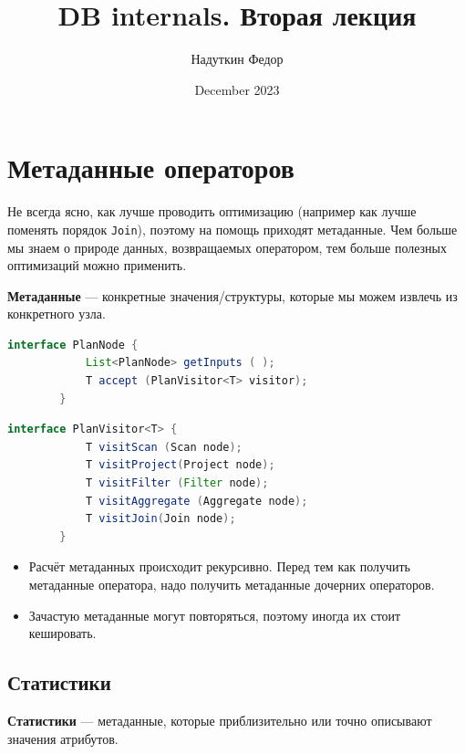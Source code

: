 \documentclass[11pt]{article}
\title{DB internals. Вторая лекция}
\author{Надуткин Федор }
\date{December 2023}
\begin{document}
    \maketitle

    \newpage

    \section*{Метаданные операторов}

    Не всегда ясно, как лучше проводить оптимизацию (например как лучше поменять порядок \texttt{Join}), поэтому на помощь приходят метаданные.
    Чем больше мы знаем о природе данных, возвращаемых оператором, тем больше полезных оптимизаций можно применить.

    \textbf{Метаданные} --- конкретные значения/структуры, которые мы можем извлечь из конкретного узла.

    \begin{lstlisting}[language=Java,label={lst:plan_node}]
        interface PlanNode {
            List<PlanNode> getInputs ( );
            T accept (PlanVisitor<T> visitor);
        }
    \end{lstlisting}

    \begin{lstlisting}[language=Java, label={lst:visitor}]
        interface PlanVisitor<T> {
            T visitScan (Scan node);
            T visitProject(Project node);
            T visitFilter (Filter node);
            T visitAggregate (Aggregate node);
            T visitJoin(Join node);
        }
    \end{lstlisting}

    \begin{itemize}
        \item Расчёт метаданных происходит рекурсивно.
        Перед тем как получить метаданные оператора, надо получить метаданные дочерних операторов.
        \item Зачастую метаданные могут повторяться, поэтому иногда их стоит кешировать.
    \end{itemize}

    \newpage

    \subsection*{Статистики}

    \textbf{Статистики} --- метаданные, которые приблизительно или точно описывают значения атрибутов.
\end{document}
